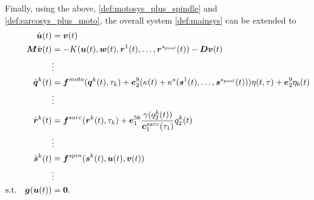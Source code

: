 Finally, using the above, \eqref{def:motosys_plus_spindle} and \eqref{def:sarcosys_plus_moto}, the overall system \eqref{def:mainsys} can be extended to
\begin{align}%
	\dot{\vu}(t) &= \vv(t)\\
	\vM\dot{\vv}(t) &= -K(\vu(t),\vw(t),\vr^1(t),\ldots,\vr^\mups(t)) - \vD\vv(t)\\
		& \vdots\nonumber\\
	\dot{\vq}^k(t) &= \fmo(\vq^k(t),\tau_k) + \ve_2^9(\kappa(t) + \kappa^s(\vs^1(t),\ldots,\vs^\mups(t)))\eta(t,\tau) + \ve_2^9\eta_b(t)\\
		 & \vdots\nonumber\\
	\dot{\vr}^k(t) &= \fsa(\vr^k(t),\tau_k) + \ve^{56}_1 \frac{\gamma(q_2^k(t))}{\csa_1(\tau_1)}q_2^k(t)\\
		& \vdots\nonumber\\
	\dot{\vs}^k(t) &= \fsp(\vs^k(t),\vu(t),\vv(t))\\
		& \vdots\nonumber\\
	\text{s.t.}\quad \vg(\vu(t))		&= \vnull.
\end{align}

